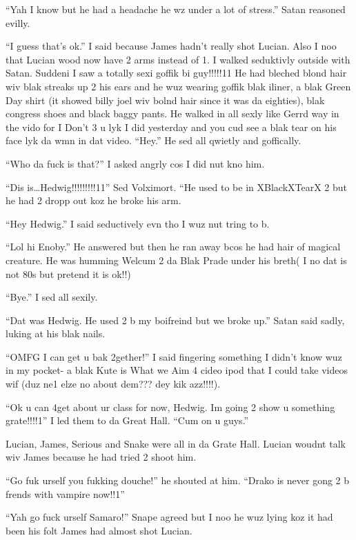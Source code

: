 \enquote{Yah I know but he had a headache he wz under a lot of stress.} Satan reasoned evilly.

\enquote{I guess that's ok.} I said because James hadn't really shot Lucian. Also I noo that Lucian wood now have 2 arms instead of 1. I walked seduktivly outside with Satan. Suddeni I saw a totally sexi goffik bi guy!!!!!11 He had bleched blond hair wiv blak streaks up 2 his ears and he wuz wearing goffik blak iliner, a blak Green Day shirt (it showed billy joel wiv bolnd hair since it was da eighties), blak congress shoes and black baggy pants. He walked in all sexly like Gerrd way in the vido for I Don't 3 u lyk I did yesterday and you cud see a blak tear on his face lyk da wmn in dat video. \enquote{Hey.} He sed all qwietly and goffically.

\enquote{Who da fuck is that?} I asked angrly cos I did nut kno him.

\enquote{Dis is…Hedwig!!!!!!!!!11} Sed Volximort. ``He used to be in XBlackXTearX 2 but he had 2 dropp out koz he broke his arm.

\enquote{Hey Hedwig.} I said seductively evn tho I wuz nut tring to b.

\enquote{Lol hi Enoby.} He answered but then he ran away bcos he had hair of magical creature. He was humming Welcum 2 da Blak Prade under his breth( I no dat is not 80s but pretend it is ok!!)

\enquote{Bye.} I sed all sexily.

\enquote{Dat was Hedwig. He used 2 b my boifreind but we broke up.} Satan said sadly, luking at his blak nails.

\enquote{OMFG I can get u bak 2gether!} I said fingering something I didn't know wuz in my pocket- a blak Kute is What we Aim 4 cideo ipod that I could take videos wif (duz ne1 elze no about dem??? dey kik azz!!!!).

\enquote{Ok u can 4get about ur class for now, Hedwig. Im going 2 show u something grate!!!!1} I led them to da Great Hall. \enquote{Cum on u guys.}

Lucian, James, Serious and Snake were all in da Grate Hall. Lucian woudnt talk wiv James because he had tried 2 shoot him.

\enquote{Go fuk urself you fukking douche!} he shouted at him. \enquote{Drako is never gong 2 b frends with vampire now!!1}

\enquote{Yah go fuck urself Samaro!} Snape agreed but I noo he wuz lying koz it had been his folt James had almost shot Lucian.

